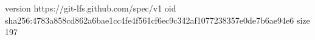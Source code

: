 version https://git-lfs.github.com/spec/v1
oid sha256:4783a858cd862a6bae1cc4fe4f561cf6ec9c342af1077238357e0de7b6ae94e6
size 197
